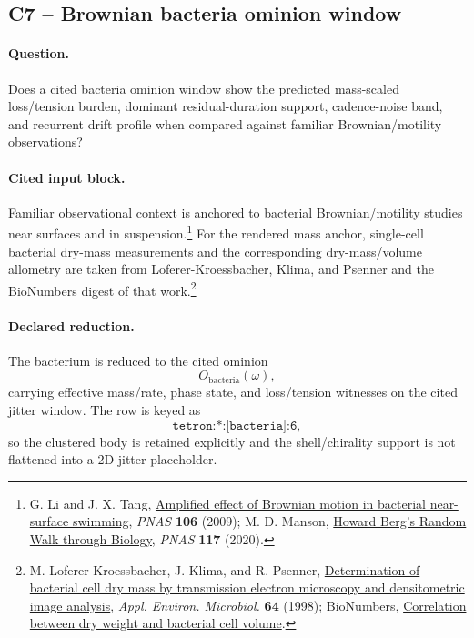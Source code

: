 \subsection{C7 -- Brownian bacteria ominion window}\label{suppc:c7-brownian-bacteria}
\paragraph{Question.} Does a cited bacteria ominion window show the predicted mass-scaled loss/tension burden, dominant residual-duration support, cadence-noise band, and recurrent drift profile when compared against familiar Brownian/motility observations?

\paragraph{Cited input block.} Familiar observational context is anchored to bacterial Brownian/motility studies near surfaces and in suspension.\footnote{G. Li and J. X. Tang, \href{https://pmc.ncbi.nlm.nih.gov/articles/PMC2587629/}{Amplified effect of Brownian motion in bacterial near-surface swimming}, \emph{PNAS} \textbf{106} (2009); M. D. Manson, \href{https://pmc.ncbi.nlm.nih.gov/articles/PMC7648147/}{Howard Berg's Random Walk through Biology}, \emph{PNAS} \textbf{117} (2020).} For the rendered mass anchor, single-cell bacterial dry-mass measurements and the corresponding dry-mass/volume allometry are taken from Loferer-Kroessbacher, Klima, and Psenner and the BioNumbers digest of that work.\footnote{M. Loferer-Kroessbacher, J. Klima, and R. Psenner, \href{https://pmc.ncbi.nlm.nih.gov/articles/PMC106103/}{Determination of bacterial cell dry mass by transmission electron microscopy and densitometric image analysis}, \emph{Appl. Environ. Microbiol.} \textbf{64} (1998); BioNumbers, \href{https://bionumbers.hms.harvard.edu/bionumber.aspx?id=106616&s=n&v=0}{Correlation between dry weight and bacterial cell volume}.}

\paragraph{Declared reduction.} The bacterium is reduced to the cited ominion
\[
O_{\mathrm{bacteria}}(\omega),
\]
carrying effective mass/rate, phase state, and loss/tension witnesses on the cited jitter window. The row is keyed as
\[
\texttt{tetron:*:[bacteria]:6},
\]
so the clustered body is retained explicitly and the shell/chirality support is not flattened into a 2D jitter placeholder.


